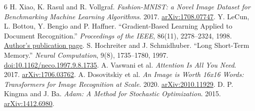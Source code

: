 \begingroup
\small
\begin{thebibliography}{6}
\setlength{\itemsep}{2pt}
H. Xiao, K. Rasul and R. Vollgraf.
\emph{Fashion-MNIST: a Novel Image Dataset for Benchmarking Machine Learning Algorithms}.
2017. \href{https://arxiv.org/abs/1708.07747}{arXiv:1708.07747}.
Y. LeCun, L. Bottou, Y. Bengio and P. Haffner.
``Gradient-Based Learning Applied to Document Recognition.''
\emph{Proceedings of the IEEE}, 86(11), 2278--2324, 1998.
\href{https://bottou.org/papers/lecun-98h}{Author's publication page}.
S. Hochreiter and J. Schmidhuber.
``Long Short-Term Memory.'' \emph{Neural Computation}, 9(8), 1735--1780, 1997.
\href{https://doi.org/10.1162/neco.1997.9.8.1735}{doi:10.1162/neco.1997.9.8.1735}.
A. Vaswani et al. \emph{Attention Is All You Need}.
2017. \href{https://arxiv.org/abs/1706.03762}{arXiv:1706.03762}.
A. Dosovitskiy et al. \emph{An Image is Worth 16x16 Words: Transformers for Image Recognition at Scale}.
2020. \href{https://arxiv.org/abs/2010.11929}{arXiv:2010.11929}.
D. P. Kingma and J. Ba. \emph{Adam: A Method for Stochastic Optimization}.
2015. \href{https://arxiv.org/abs/1412.6980}{arXiv:1412.6980}.
\end{thebibliography}
\endgroup
